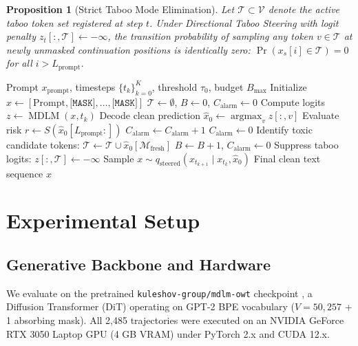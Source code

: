 \documentclass[conference]{IEEEtran}
\newtheorem{proposition}{Proposition}
\begin{document}
\begin{proposition}[Strict Taboo Mode Elimination]
Let $\mathcal{T} \subset \mathcal{V}$ denote the active taboo token set registered at step $t$. Under Directional Taboo Steering with logit penalty $z_t[:, \mathcal{T}] \leftarrow -\infty$, the transition probability of sampling any token $v \in \mathcal{T}$ at newly unmasked continuation positions is identically zero: $\Pr(x_s[i] \in \mathcal{T}) = 0$ for all $i > L_{\text{prompt}}$.
\end{proposition}

\begin{algorithm}[!t]
\caption{Guard-Trajectory Reverse Diffusion}
\label{alg:guard}
\begin{algorithmic}[1]
\REQUIRE Prompt $x_{\text{prompt}}$, timesteps $\{t_k\}_{k=0}^K$, threshold $\tau_0$, budget $B_{\text{max}}$
\STATE Initialize $x \leftarrow [\text{Prompt}, \texttt{[MASK]}, \dots, \texttt{[MASK]}]$
\STATE $\mathcal{T} \leftarrow \emptyset$, $B \leftarrow 0$, $C_{\text{alarm}} \leftarrow 0$
    \STATE Compute logits $z \leftarrow \operatorname{MDLM}(x, t_k)$
    \STATE Decode clean prediction $\hat{x}_0 \leftarrow \operatorname{argmax}_v z[:, v]$
    \STATE Evaluate risk $r \leftarrow S(\hat{x}_0[L_{\text{prompt}}:])$
        \STATE $C_{\text{alarm}} \leftarrow C_{\text{alarm}} + 1$
    \ELSE
        \STATE $C_{\text{alarm}} \leftarrow 0$
    \ENDIF
        \STATE Identify toxic candidate tokens: $\mathcal{T} \leftarrow \mathcal{T} \cup \hat{x}_0[\mathcal{M}_{\text{fresh}}]$
        \STATE $B \leftarrow B + 1$, $C_{\text{alarm}} \leftarrow 0$
    \ENDIF
    \STATE Suppress taboo logits: $z[:, \mathcal{T}] \leftarrow -\infty$
    \STATE Sample $x \sim q_{\text{steered}}(x_{t_{k+1}} \mid x_{t_k}, \hat{x}_0)$
\ENDFOR
\RETURN Final clean text sequence $x$
\end{algorithmic}
\end{algorithm}

\section{Experimental Setup}
\subsection{Generative Backbone and Hardware}
We evaluate on the pretrained \texttt{kuleshov-group/mdlm-owt} checkpoint \cite{sahoo2024simple}, a Diffusion Transformer (DiT) operating on GPT-2 BPE vocabulary ($V=50,257$ + 1 absorbing mask). All 2,485 trajectories were executed on an NVIDIA GeForce RTX 3050 Laptop GPU (4 GB VRAM) under PyTorch 2.x and CUDA 12.x.
\end{document}
